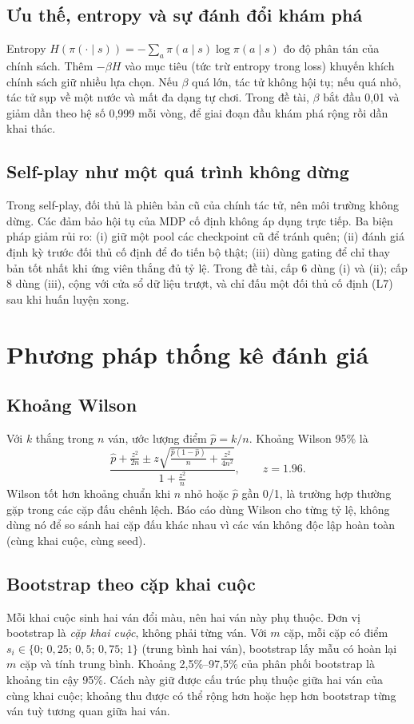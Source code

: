 \subsection{Ưu thế, entropy và sự đánh đổi khám phá}
\label{sec:lt-entropy}
Entropy $H(\pi(\cdot\mid s))=-\sum_a\pi(a\mid s)\log\pi(a\mid s)$ đo độ phân tán của chính sách.
Thêm $-\beta H$ vào mục tiêu (tức trừ entropy trong loss) khuyến khích chính sách giữ nhiều lựa
chọn. Nếu $\beta$ quá lớn, tác tử không hội tụ; nếu quá nhỏ, tác tử sụp về một nước và mất đa
dạng tự chơi. Trong đề tài, $\beta$ bắt đầu 0,01 và giảm dần theo hệ số 0,999 mỗi vòng, để giai
đoạn đầu khám phá rộng rồi dần khai thác.

\subsection{Self-play như một quá trình không dừng}
\label{sec:lt-nonstationary}
Trong self-play, đối thủ là phiên bản cũ của chính tác tử, nên môi trường không dừng. Các đảm
bảo hội tụ của MDP cố định không áp dụng trực tiếp. Ba biện pháp giảm rủi ro: (i) giữ một pool
các checkpoint cũ để tránh quên; (ii) đánh giá định kỳ trước đối thủ cố định để đo tiến bộ thật;
(iii) dùng gating để chỉ thay bản tốt nhất khi ứng viên thắng đủ tỷ lệ. Trong đề tài, cấp 6 dùng
(i) và (ii); cấp 8 dùng (iii), cộng với cửa sổ dữ liệu trượt, và chỉ đấu một đối thủ cố định (L7) sau
khi huấn luyện xong.

\section{Phương pháp thống kê đánh giá}
\label{sec:lt-thong-ke}
\subsection{Khoảng Wilson}
Với $k$ thắng trong $n$ ván, ước lượng điểm $\hat p=k/n$. Khoảng Wilson 95\% là
\begin{equation}
  \frac{\hat p + \frac{z^2}{2n} \pm z\sqrt{\frac{\hat p(1-\hat p)}{n}+\frac{z^2}{4n^2}}}{1+\frac{z^2}{n}},
  \qquad z=1.96.
  \label{eq:wilson}
\end{equation}
Wilson tốt hơn khoảng chuẩn khi $n$ nhỏ hoặc $\hat p$ gần 0/1, là trường hợp thường gặp trong
các cặp đấu chênh lệch. Báo cáo dùng Wilson cho từng tỷ lệ, không dùng nó để so sánh hai cặp
đấu khác nhau vì các ván không độc lập hoàn toàn (cùng khai cuộc, cùng seed).

\subsection{Bootstrap theo cặp khai cuộc}
Mỗi khai cuộc sinh hai ván đổi màu, nên hai ván này phụ thuộc. Đơn vị bootstrap là \emph{cặp
khai cuộc}, không phải từng ván. Với $m$ cặp, mỗi cặp có điểm $s_i\in\{0;\,0{,}25;\,0{,}5;\,0{,}75;\,1\}$ (trung bình
hai ván), bootstrap lấy mẫu có hoàn lại $m$ cặp và tính trung bình. Khoảng 2,5\%--97,5\% của
phân phối bootstrap là khoảng tin cậy 95\%. Cách này giữ được cấu trúc phụ thuộc giữa hai ván của
cùng khai cuộc; khoảng thu được có thể rộng hơn hoặc hẹp hơn bootstrap từng ván tuỳ tương quan giữa hai ván.

